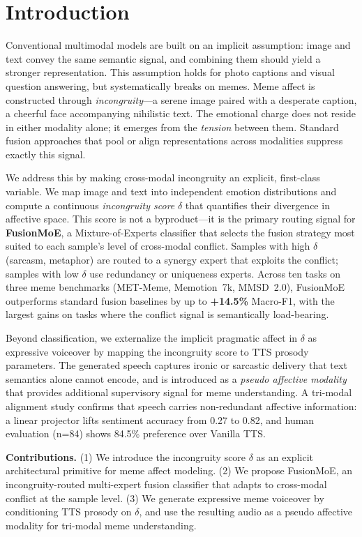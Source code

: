 \section{Introduction}

Conventional multimodal models are built on an implicit assumption: image and text convey the same
semantic signal, and combining them should yield a stronger representation. This assumption holds for
photo captions and visual question answering, but systematically breaks on memes.
Meme affect is constructed through \emph{incongruity}—a serene image paired with a desperate
caption, a cheerful face accompanying nihilistic text. The emotional charge does not reside in either
modality alone; it emerges from the \emph{tension} between them. Standard fusion approaches that pool
or align representations across modalities suppress exactly this signal.

We address this by making cross-modal incongruity an explicit, first-class variable.
We map image and text into independent emotion distributions and compute a continuous
\emph{incongruity score} $\delta$ that quantifies their divergence in affective space.
This score is not a byproduct—it is the primary routing signal for \textbf{FusionMoE}, a
Mixture-of-Experts classifier that selects the fusion strategy most suited to each sample's level of
cross-modal conflict. Samples with high $\delta$ (sarcasm, metaphor) are routed to a synergy expert
that exploits the conflict; samples with low $\delta$ use redundancy or uniqueness experts.
Across ten tasks on three meme benchmarks (MET-Meme, Memotion~7k, MMSD~2.0), FusionMoE outperforms
standard fusion baselines by up to \textbf{+14.5\%} Macro-F1, with the largest gains on tasks where
the conflict signal is semantically load-bearing.

Beyond classification, we externalize the implicit pragmatic affect in $\delta$ as expressive
voiceover by mapping the incongruity score to TTS prosody parameters. The generated speech
captures ironic or sarcastic delivery that text semantics alone cannot encode, and is introduced
as a \emph{pseudo affective modality} that provides additional supervisory signal for meme
understanding. A tri-modal alignment study confirms that speech carries non-redundant affective
information: a linear projector lifts sentiment accuracy from 0.27 to 0.82, and human evaluation
(n=84) shows 84.5\% preference over Vanilla TTS.

\textbf{Contributions.} (1) We introduce the incongruity score $\delta$ as an explicit architectural
primitive for meme affect modeling. (2) We propose FusionMoE, an incongruity-routed multi-expert
fusion classifier that adapts to cross-modal conflict at the sample level. (3) We generate expressive
meme voiceover by conditioning TTS prosody on $\delta$, and use the resulting audio as a pseudo
affective modality for tri-modal meme understanding.
